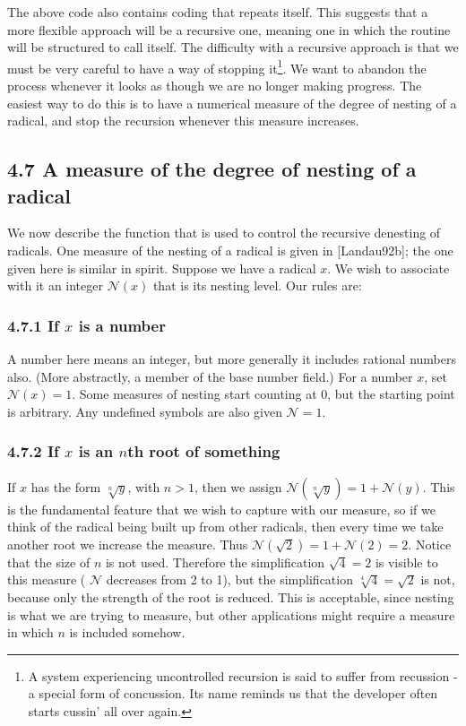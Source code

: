 \documentclass[11pt,letterpaper]{article}
\begin{document}
The above code also contains coding that repeats itself. This suggests that a more flexible approach will be a recursive one, meaning one in which the routine will be structured to call itself. The difficulty with a recursive approach is that we must be very careful to have a way of stopping it\footnote{A system experiencing uncontrolled recursion is said to suffer from recussion - a special form of concussion. Its name reminds us that the developer often starts cussin' all over again.}. We want to abandon the process whenever it looks as though we are no longer making progress. The easiest way to do this is to have a numerical measure of the degree of nesting of a radical, and stop the recursion whenever this measure increases.

\subsection*{4.7 A measure of the degree of nesting of a radical}
We now describe the function that is used to control the recursive denesting of radicals. One measure of the nesting of a radical is given in [Landau92b]; the one given here is similar in spirit. Suppose we have a radical $x$. We wish to associate with it an integer $\mathcal{N}(x)$ that is its nesting level. Our rules are:

\subsubsection*{4.7.1 If $x$ is a number}
A number here means an integer, but more generally it includes rational numbers also. (More abstractly, a member of the base number field.) For a number $x$, set $\mathcal{N}(x)=1$. Some measures of nesting start counting at 0, but the starting point is arbitrary. Any undefined symbols are also given $\mathcal{N}=1$.

\subsubsection*{4.7.2 If $x$ is an $n$th root of something}
If $x$ has the form $\sqrt[n]{y}$, with $n>1$, then we assign $\mathcal{N}(\sqrt[n]{y})=1+\mathcal{N}(y)$. This is the fundamental feature that we wish to capture with our measure, so if we think of the radical being built up from other radicals, then every time we take another root we increase the measure. Thus $\mathcal{N}(\sqrt{2})=1+\mathcal{N}(2)=2$. Notice that the size of $n$ is not used. Therefore the simplification $\sqrt{4}=2$ is visible to this measure ( $\mathcal{N}$ decreases from 2 to 1), but the simplification $\sqrt[4]{4}=\sqrt{2}$ is not, because only the strength of the root is reduced. This is acceptable, since nesting is what we are trying to measure, but other applications might require a measure in which $n$ is included somehow.
\end{document}
